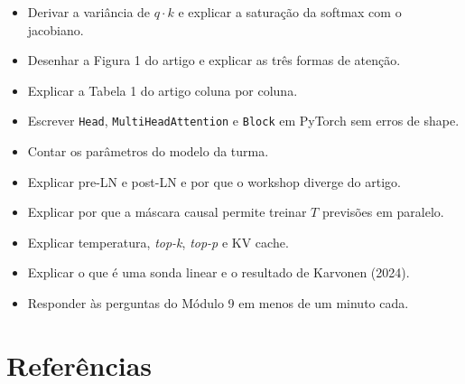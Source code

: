 \documentclass[
  11pt,
]{article}
\providecommand{\tightlist}{%
  \setlength{\itemsep}{0pt}\setlength{\parskip}{0pt}}
\begin{document}
\begin{itemize}
\tightlist
\item
  Derivar a variância de \(q \cdot k\) e explicar a saturação da softmax
  com o jacobiano.
\item
  Desenhar a Figura 1 do artigo e explicar as três formas de atenção.
\item
  Explicar a Tabela 1 do artigo coluna por coluna.
\item
  Escrever \texttt{Head}, \texttt{MultiHeadAttention} e \texttt{Block}
  em PyTorch sem erros de shape.
\item
  Contar os parâmetros do modelo da turma.
\item
  Explicar pre-LN e post-LN e por que o workshop diverge do artigo.
\item
  Explicar por que a máscara causal permite treinar \(T\) previsões em
  paralelo.
\item
  Explicar temperatura, \emph{top-k}, \emph{top-p} e KV cache.
\item
  Explicar o que é uma sonda linear e o resultado de Karvonen (2024).
\item
  Responder às perguntas do Módulo 9 em menos de um minuto cada.
\end{itemize}

\section{Referências}\label{referuxeancias}
\end{document}

